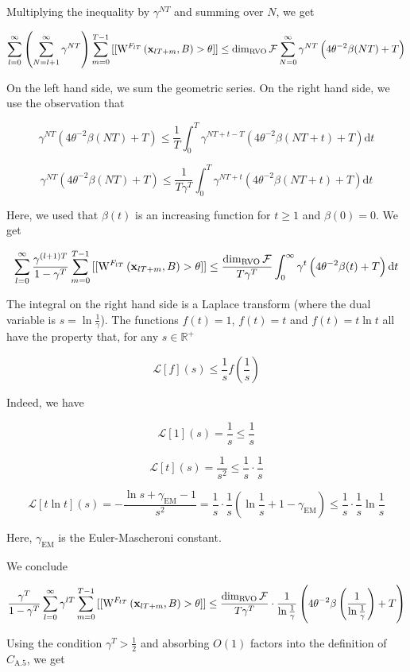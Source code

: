 \documentclass[a4paper]{article}
\newcommand{\AP}[1]{\left(#1\right)}
\newcommand{\D}{\mathrm{d}}
\newcommand{\Reals}{\mathbb{R}}
\newcommand{\B}{B}
\newcommand{\F}{\mathcal{F}}
\DeclareMathOperator{\RVO}{\dim_{RVO}}
\newcommand{\W}{\mathrm{W}}
\begin{document}
Multiplying the inequality by $\gamma^{NT}$ and summing over $N$, we get

$$\sum_{l=0}^{\infty}\AP{\sum_{N=l+1}^\infty \gamma^{NT}}\sum_{m=0}^{T-1}{[[\W^{F_{lT}}\AP{\bold{x}_{lT+m},\B}>\theta]]} \leq \RVO{\F}\sum_{N=0}^\infty\gamma^{NT}\AP{4\theta^{-2}\beta(NT)+T}$$

On the left hand side, we sum the geometric series. On the right hand side, we use the observation that

$$\gamma^{NT}\AP{4\theta^{-2}\beta(NT)+T} \leq \frac{1}{T}\int_0^T \gamma^{NT+t-T}\AP{4\theta^{-2}\beta(NT+t)+T}\D t$$

$$\gamma^{NT}\AP{4\theta^{-2}\beta(NT)+T} \leq \frac{1}{T\gamma^T}\int_0^T \gamma^{NT+t}\AP{4\theta^{-2}\beta(NT+t)+T}\D t$$

Here, we used that $\beta(t)$ is an increasing function for $t\geq 1$ and $\beta(0)=0$. We get

$$\sum_{l=0}^{\infty}\frac{\gamma^{(l+1)T}}{1-\gamma^T}\sum_{m=0}^{T-1}{[[\W^{F_{lT}}\AP{\bold{x}_{lT+m},\B}>\theta]]} \leq \frac{\RVO{\F}}{T\gamma^T}\int_0^\infty\gamma^{t}\AP{4\theta^{-2}\beta(t)+T}\D t$$

The integral on the right hand side is a Laplace transform (where the dual variable is $s=\ln\frac{1}{\gamma}$). The functions $f(t)=1$, $f(t)=t$ and $f(t)=t\ln{t}$ all have the property that, for any $s\in\Reals^+$

$$\mathcal{L}[f](s)\leq \frac{1}{s}f\AP{\frac{1}{s}}$$

Indeed, we have

$$\mathcal{L}[1](s) = \frac{1}{s} \leq \frac{1}{s}$$

$$\mathcal{L}[t](s) = \frac{1}{s^2} \leq \frac{1}{s}\cdot\frac{1}{s}$$

$$\mathcal{L}[t\ln{t}](s) = -\frac{\ln{s}+\gamma_{\text{EM}}-1}{s^2}=\frac{1}{s}\cdot \frac{1}{s}\AP{\ln{\frac{1}{s}}+1-\gamma_{\text{EM}}}\leq\frac{1}{s}\cdot \frac{1}{s}\ln{\frac{1}{s}}$$

Here, $\gamma_{\text{EM}}$ is the Euler-Mascheroni constant.

We conclude

$$\frac{\gamma^T}{1-\gamma^T}\sum_{l=0}^{\infty}\gamma^{lT}\sum_{m=0}^{T-1}{[[\W^{F_{lT}}\AP{\bold{x}_{lT+m},\B}>\theta]]} \leq \frac{\RVO{\F}}{T\gamma^T}\cdot\frac{1}{\ln{\frac{1}{\gamma}}}\AP{4\theta^{-2}\beta\AP{\frac{1}{\ln\frac{1}{\gamma}}}+T}$$

Using the condition $\gamma^T>\frac{1}{2}$ and absorbing $O(1)$ factors into the definition of $C_{\text{A.5}}$, we get
\end{document}
